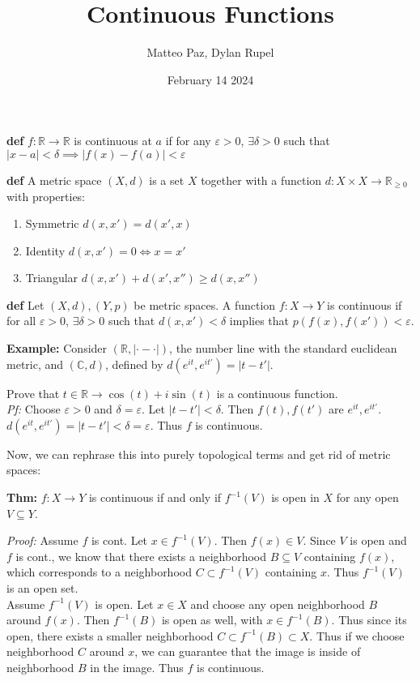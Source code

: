 \documentclass{article}
\author{Matteo Paz, Dylan Rupel}
\date{February 14 2024}
\title{Continuous Functions}
\newcommand{\RR}{\mathbb{R}}
\begin{document}
\maketitle{}

\noindent
\textbf{def} $f: \RR \to \RR$ is continuous at $a$ if for any $\varepsilon > 0$, $\exists \delta > 0$ such that
$|x - a| < \delta \implies |f(x) - f(a)| < \varepsilon$

\vspace{1em}
\noindent
\textbf{def} A metric space $(X,d)$ is a set $X$ together with a function $d: X \times X \to \RR_{\geq 0}$
with properties:
\begin{enumerate}
    \item Symmetric $d(x,x') = d(x', x)$
    \item Identity $d(x,x') = 0 \iff x = x'$
    \item Triangular $d(x, x') + d(x', x'') \geq d(x,x'')$
\end{enumerate}
\vspace{1em}
\noindent
\textbf{def} Let $(X, d), (Y, p)$ be metric spaces. A function $f: X \to Y$ is continuous 
if for all $\varepsilon > 0$, $\exists\delta > 0$ such that $d(x,x') < \delta$ implies that $p(f(x), f(x')) < \varepsilon$.
\vspace{1em}

\textbf{Example:} Consider $(\RR, |\cdot - \cdot|)$, the number line with the standard euclidean metric, and $(\mathbb{C}, d)$, defined by $d(e^{it}, e^{it'}) = |t-t'|$. \\
\vspace{1em}

Prove that $t \in \RR \to \cos(t) + i\sin(t)$ is a continuous function. \\
\emph{Pf:}
Choose $\varepsilon > 0$ and $\delta = \varepsilon$. Let $|t - t'| < \delta$. Then $f(t), f(t')$ are $e^{it}, e^{it'}$. \\
$d(e^{it}, e^{it'}) = |t - t'| < \delta = \varepsilon$. Thus $f$ is continuous.

\vspace{2em}
Now, we can rephrase this into purely topological terms and get rid of metric spaces:

\textbf{Thm:} $f: X \to Y$ is continuous if and only if $f^{-1} (V)$ is open in $X$ for
any open $V \subseteq Y$.

\emph{Proof:} Assume $f$ is cont. Let $x \in f^{-1}(V)$. Then $f(x) \in V$. Since $V$ is open and $f$ is cont., we know
that there exists a neighborhood $B\subseteq V$ containing $f(x)$, which corresponds to a neighborhood $C \subset f^{-1}(V)$ containing $x$. Thus $f^{-1}(V)$ is an 
open set. \\
Assume $f^{-1}(V)$ is open. Let $x \in X$ and choose any open neighborhood $B$ around $f(x)$. Then $f^{-1}(B)$ is open as well, with $x \in f^{-1}(B)$. Thus since its open, there exists a smaller neighborhood $C \subset f^{-1}(B) \subset X$. Thus if we choose neighborhood $C$ around $x$, we can guarantee that the image is inside of neighborhood $B$ in the image. Thus $f$ is continuous.
\newpage
\end{document}
